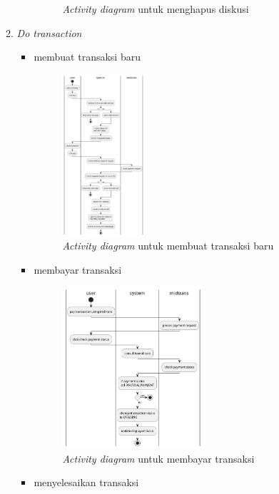 \documentclass[a4paper]{article}
\begin{document}
\begin{enumerate}
\begin{enumerate}
\begin{itemize}
\begin{figure}[h]
                \caption{\textit{Activity diagram} untuk menghapus diskusi}
            \end{figure}
        \end{itemize}
        \newpage

        \item \textit{Do transaction}
        \begin{itemize}
            \item membuat transaksi baru
            \begin{figure}[h]
                \centering
                \includegraphics*[height=6cm]{./diagram/activity diagram/15. transaction/create transcation/create transcation.png}
                \caption{\textit{Activity diagram} untuk membuat transaksi baru}
            \end{figure}
            \item membayar transaksi
            \begin{figure}[h]
                \centering
                \includegraphics*[height=6cm]{./diagram/activity diagram/15. transaction/pay transaction/pay trx.png}
                \caption{\textit{Activity diagram} untuk membayar transaksi}
            \end{figure}
            \newpage
            \item menyelesaikan transaksi
            \begin{figure}[h]

\end{figure}
\end{itemize}
\end{enumerate}
\end{enumerate}
\end{document}
